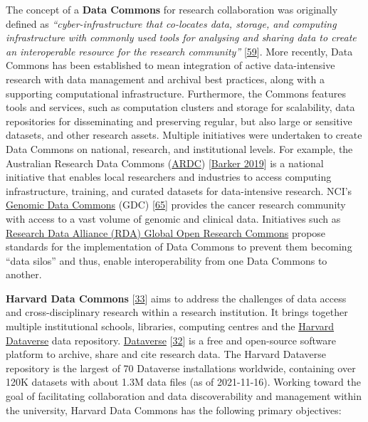 The concept of a \textbf{Data Commons} for research collaboration was
originally defined as \emph{``cyber-infrastructure that co-locates data,
storage, and computing infrastructure with commonly used tools for
analysing and sharing data to create an interoperable resource for the
research community''}
{[}\href{https://doi.org/10.1109/MCSE.2016.92}{59}{]}. More recently,
Data Commons has been established to mean integration of active
data-intensive research with data management and archival best
practices, along with a supporting computational infrastructure.
Furthermore, the Commons features tools and services, such as
computation clusters and storage for scalability, data repositories for
disseminating and preserving regular, but also large or sensitive
datasets, and other research assets. Multiple initiatives were
undertaken to create Data Commons on national, research, and
institutional levels. For example, the Australian Research Data Commons
(\href{https://ardc.edu.au}{ARDC})
{[}\href{https://doi.org/10.5334/dsj-2019-044}{Barker 2019}{]} is a national
initiative that enables local researchers and industries to access
computing infrastructure, training, and curated datasets for
data-intensive research. NCI's \href{https://gdc.cancer.gov/}{Genomic
Data Commons} (GDC)
{[}\href{https://doi.org/10.1182/blood-2017-03-735654}{65}{]} provides
the cancer research community with access to a vast volume of genomic
and clinical data. Initiatives such as
\href{https://www.rd-alliance.org/groups/global-open-research-commons-ig}{Research
Data Alliance (RDA) Global Open Research Commons} propose standards for
the implementation of Data Commons to prevent them becoming ``data
silos'' and thus, enable interoperability from one Data Commons to
another.

\textbf{Harvard Data Commons}
{[}\href{https://doi.org/10.7557/5.5422}{33}{]} aims to address the
challenges of data access and cross-disciplinary research within a
research institution. It brings together multiple institutional schools,
libraries, computing centres and the
\href{https://dataverse.harvard.edu/}{Harvard Dataverse} data
repository. \href{https://dataverse.org/}{Dataverse}
{[}\href{https://doi.org/10.1045/january2011-crosas}{32}{]} is a free
and open-source software platform to archive, share and cite research
data. The Harvard Dataverse repository is the largest of 70 Dataverse
installations worldwide, containing over 120K datasets with about 1.3M
data files (as of 2021-11-16). Working toward the goal of facilitating
collaboration and data discoverability and management within the
university, Harvard Data Commons has the following primary objectives:


